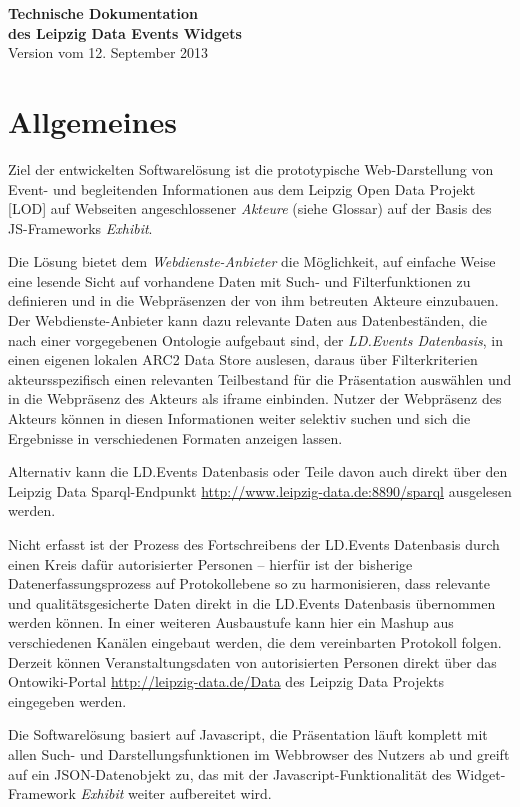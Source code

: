 \documentclass[11pt,a4paper]{article}
\begin{document}
\begin{center}
  \textbf{\Large Technische Dokumentation\\[.3em] des Leipzig Data Events
    Widgets}\\[1em] Version vom 12. September 2013
\end{center}

\section{Allgemeines}
Ziel der entwickelten Softwarelösung ist die prototypische Web-Darstellung von
Event- und begleitenden Informationen aus dem Leipzig Open Data Projekt [LOD]
auf Webseiten angeschlossener \emph{Akteure} (siehe Glossar) auf der Basis des
JS-Frameworks \emph{Exhibit}.

Die Lösung bietet dem \emph{Webdienste-Anbieter} die Möglichkeit, auf einfache
Weise eine lesende Sicht auf vorhandene Daten mit Such- und Filterfunktionen
zu definieren und in die Webpräsenzen der von ihm betreuten Akteure
einzubauen.  Der Webdienste-Anbieter kann dazu relevante Daten aus
Datenbeständen, die nach einer vorgegebenen Ontologie aufgebaut sind, der
\emph{LD.Events Datenbasis}, in einen eigenen lokalen ARC2 Data Store
auslesen, daraus über Filterkriterien akteursspezifisch einen relevanten
Teilbestand für die Präsentation auswählen und in die Webpräsenz des Akteurs
als iframe einbinden.  Nutzer der Webpräsenz des Akteurs können in diesen
Informationen weiter selektiv suchen und sich die Ergebnisse in verschiedenen
Formaten anzeigen lassen.

Alternativ kann die LD.Events Datenbasis oder Teile davon auch direkt über den
Leipzig Data Sparql-Endpunkt \url{http://www.leipzig-data.de:8890/sparql}
ausgelesen werden. 

Nicht erfasst ist der Prozess des Fortschreibens der LD.Events Datenbasis
durch einen Kreis dafür autorisierter Personen -- hierfür ist der bisherige
Datenerfassungsprozess auf Protokollebene so zu harmonisieren, dass relevante
und qualitätsgesicherte Daten direkt in die LD.Events Datenbasis übernommen
werden können. In einer weiteren Ausbaustufe kann hier ein Mashup aus
verschiedenen Kanälen eingebaut werden, die dem vereinbarten Protokoll folgen.
Derzeit können Veranstaltungsdaten von autorisierten Personen direkt über das
Ontowiki-Portal \url{http://leipzig-data.de/Data} des Leipzig Data Projekts
eingegeben werden.

Die Softwarelösung basiert auf Javascript, die Präsentation läuft komplett mit
allen Such- und Darstellungsfunktionen im Webbrowser des Nutzers ab und greift
auf ein JSON-Datenobjekt zu, das mit der Javascript-Funktionalität des
Widget-Framework \emph{Exhibit} weiter aufbereitet wird.
\end{document}
